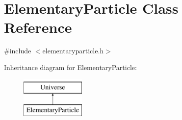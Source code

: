 \hypertarget{classElementaryParticle}{}\section{Elementary\+Particle Class Reference}
\label{classElementaryParticle}


{\ttfamily \#include $<$elementaryparticle.\+h$>$}

Inheritance diagram for Elementary\+Particle\+:\begin{figure}[H]
\begin{center}
\leavevmode
\includegraphics[height=2.000000cm]{classElementaryParticle}
\end{center}
\end{figure}
